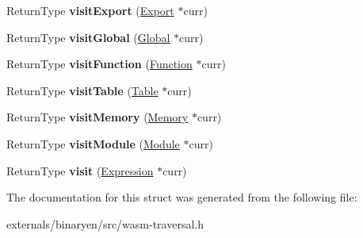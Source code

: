 \begin{DoxyCompactItemize}
\item 
\mbox{\label{structwasm_1_1_visitor_a4dc3c272286cca4038f63534fd26ab3b}} 
Return\+Type {\bfseries visit\+Export} (\mbox{\hyperlink{classwasm_1_1_export}{Export}} $\ast$curr)
\item 
\mbox{\label{structwasm_1_1_visitor_a57d22b2ceb79f88226653177d4449f9c}} 
Return\+Type {\bfseries visit\+Global} (\mbox{\hyperlink{classwasm_1_1_global}{Global}} $\ast$curr)
\item 
\mbox{\label{structwasm_1_1_visitor_aa31b54305d0a5c4f4e746a4fba107171}} 
Return\+Type {\bfseries visit\+Function} (\mbox{\hyperlink{classwasm_1_1_function}{Function}} $\ast$curr)
\item 
\mbox{\label{structwasm_1_1_visitor_ad88708413720ed3201633581f4474e0e}} 
Return\+Type {\bfseries visit\+Table} (\mbox{\hyperlink{classwasm_1_1_table}{Table}} $\ast$curr)
\item 
\mbox{\label{structwasm_1_1_visitor_afd9e3992cd5164183182c63870ec824d}} 
Return\+Type {\bfseries visit\+Memory} (\mbox{\hyperlink{classwasm_1_1_memory}{Memory}} $\ast$curr)
\item 
\mbox{\label{structwasm_1_1_visitor_af289b994c323ead7216faea47cebd7b3}} 
Return\+Type {\bfseries visit\+Module} (\mbox{\hyperlink{classwasm_1_1_module}{Module}} $\ast$curr)
\item 
\mbox{\label{structwasm_1_1_visitor_ad6f9ee57729376f2e699b891cf4e3a96}} 
Return\+Type {\bfseries visit} (\mbox{\hyperlink{classwasm_1_1_expression}{Expression}} $\ast$curr)
\end{DoxyCompactItemize}


The documentation for this struct was generated from the following file\+:\begin{DoxyCompactItemize}
\item 
externals/binaryen/src/wasm-\/traversal.\+h\end{DoxyCompactItemize}
